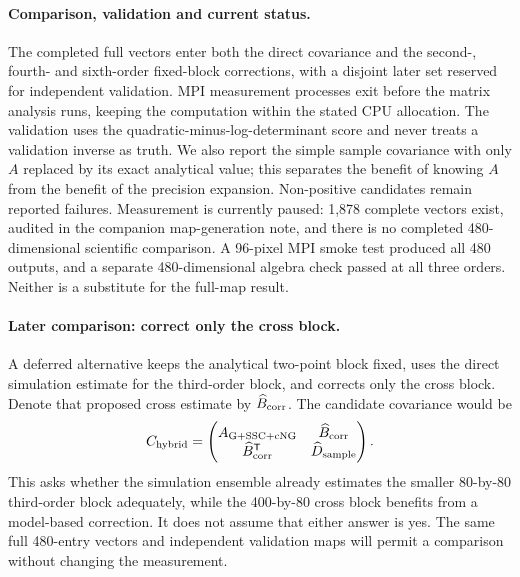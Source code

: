 \paragraph{Comparison, validation and current status.}
The completed full vectors enter both the direct covariance and the
second-, fourth- and sixth-order fixed-block corrections, with a disjoint
later set reserved for independent validation. MPI measurement processes exit
before the matrix analysis runs, keeping the computation within the stated
CPU allocation. The validation uses the quadratic-minus-log-determinant
score and never treats a validation inverse as truth. We also report the
simple sample covariance with only $A$ replaced by its exact analytical
value; this separates the benefit of knowing $A$ from the benefit of the
precision expansion. Non-positive candidates remain reported failures.
Measurement is currently paused: 1,878 complete vectors exist, audited in
the companion map-generation note, and there is no completed
480-dimensional scientific comparison. A 96-pixel MPI smoke test produced
all 480 outputs, and a separate 480-dimensional algebra check passed at all
three orders. Neither is a substitute for the full-map result.

\paragraph{Later comparison: correct only the cross block.}
A deferred alternative keeps the analytical two-point block fixed, uses
the direct simulation estimate for the third-order block, and corrects
only the cross block. Denote that proposed cross estimate by
$\widehat B_{\rm corr}$. The candidate covariance would be
\begin{equation}
 C_{\rm hybrid}=\begin{pmatrix}
 A_{\mathrm{G+SSC+cNG}}&\widehat B_{\rm corr}\\
 \widehat B_{\rm corr}^{\mathsf T}&\widehat D_{\rm sample}
 \end{pmatrix}.
\end{equation}
This asks whether the simulation ensemble already estimates the smaller
80-by-80 third-order block adequately, while the 400-by-80 cross block
benefits from a model-based correction. It does not assume that either
answer is yes. The same full 480-entry vectors and independent validation
maps will permit a comparison without changing the measurement.

